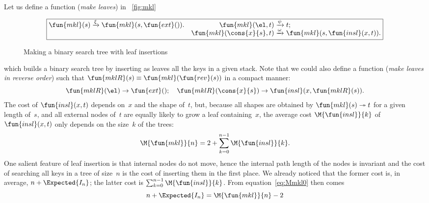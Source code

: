 Let us define a function 
 (\emph{make leaves}) in \fig~\vref{fig:mkl}
\begin{figure}[b]
\begin{equation*}
\boxed{
\begin{array}{@{}r@{\;}l@{\;}lr@{\;}l@{\;}l@{}}
  \fun{mkl}(s) & \xrightarrow{\smash{\xi}} & \fun{mkl}(s,\fun{ext}()).
& \fun{mkl}(\el,t) & \xrightarrow{\smash{\psi}} & t;\\
& & & \fun{mkl}(\cons{x}{s},t) & \xrightarrow{\smash{\omega}} & \fun{mkl}(s,\fun{insl}(x,t)).
\end{array}}
\end{equation*}
\caption{Making a binary search tree with leaf insertions}
\label{fig:mkl}
\end{figure}
which builds a binary search tree by inserting as leaves all the keys
in a given stack. Note that we could also define a function
 (\emph{make leaves in reverse order}) such that
\(\fun{mklR}(s) \equiv \fun{mkl}(\fun{rev}(s))\) in a compact manner:
\begin{equation}
  \fun{mklR}(\el) \rightarrow \fun{ext}();
  \quad
  \fun{mklR}(\cons{x}{s}) \rightarrow \fun{insl}(x,\fun{mklR}(s)).
\label{eq:mklR}
\end{equation}
The cost of \(\fun{insl}(x,t)\) depends on~\(x\) and the shape
of~\(t\), but, because all shapes are obtained by \(\fun{mkl}(s)
\twoheadrightarrow t\) for a given length of~\(s\), and all external
nodes of~\(t\) are equally likely to grow a leaf containing~\(x\), the
average cost \(\M{\fun{insl}}{k}\) of
\(\fun{insl}(x,t)\) only depends on the size~\(k\) of the trees:
\begin{equation}
\M{\fun{mkl}}{n} = 2 + \sum_{k=0}^{n-1}\M{\fun{insl}}{k}.
\label{eq:Mmkl0}
\end{equation}
One salient feature of leaf insertion is that internal nodes do not
move, hence the internal path length of the nodes is invariant and the cost of
searching all keys in a tree of size~\(n\) is the cost of inserting
them in the first place. We already noticed that the former cost is,
in average, \(n + \Expected{I_n}\); the latter cost is
\(\sum_{k=0}^{n-1}\M{\fun{insl}}{k}\). From equation~\eqref{eq:Mmkl0}
then comes
\begin{equation}
n + \Expected{I_n} = \M{\fun{mkl}}{n} - 2
\label{eq:n_EIn}
\end{equation}
